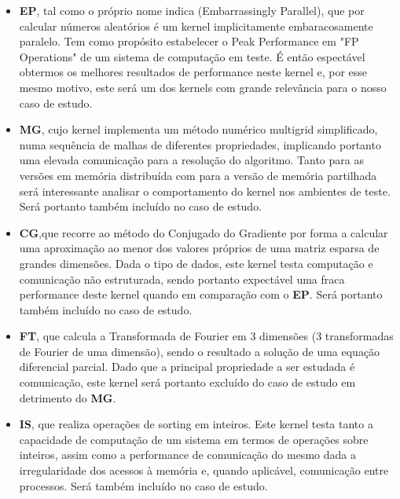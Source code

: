 \documentclass[conference,compsoc]{IEEEtran}
\begin{document}
\begin{itemize}

\item \textbf{EP},  tal como o próprio nome indica (Embarrassingly Parallel), que por calcular números aleatórios é um kernel implicitamente embaracosamente paralelo. Tem como propósito estabelecer o Peak Performance em "FP Operations" de um sistema de computação em teste. É então espectável obtermos os melhores resultados de performance neste kernel e, por esse mesmo motivo, este será um dos kernels com grande relevância para o nosso caso de estudo.

\item \textbf{MG}, cujo kernel  implementa um método numérico multigrid simplificado, numa sequência de malhas de diferentes propriedades, implicando portanto uma elevada comunicação para a resolução do algoritmo. Tanto para as versões em memória distribuída com para a versão de memória partilhada será interessante analisar o comportamento do kernel nos ambientes de teste. Será portanto também incluído no caso de estudo.

\item \textbf{CG},que recorre ao método do Conjugado do Gradiente por forma a calcular uma aproximação ao menor dos valores próprios de uma matriz esparsa de grandes dimensões. Dada o tipo de dados, este kernel testa computação e comunicação não estruturada, sendo portanto expectável uma fraca performance deste kernel quando em comparação com o \textbf{EP}. Será portanto também incluído no caso de estudo.

\item \textbf{FT}, que calcula a Transformada de Fourier em 3 dimensões (3 transformadas de Fourier de uma dimensão), sendo o resultado a solução de uma equação diferencial parcial. Dado que a principal propriedade a ser estudada é comunicação, este kernel será portanto excluído do caso de estudo em detrimento do \textbf{MG}.


\item \textbf{IS}, que realiza operações de sorting em inteiros. Este kernel testa tanto a capacidade de computação de um sistema em termos de operações sobre inteiros, assim como a performance de comunicação do mesmo dada a irregularidade dos acessos à memória e, quando aplicável, comunicação entre processos. Será também incluído no caso de estudo.

 \end{itemize}
\end{document}

